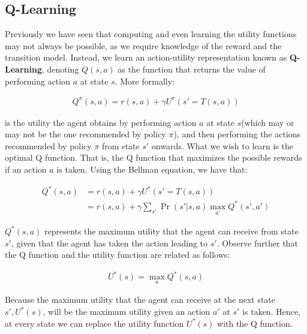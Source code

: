 \documentclass[12pt]{article}
\begin{document}
\subsection{Q-Learning}

Previously we have seen that computing and even learning the utility functions may not always be possible, as we require knowledge of the reward and the transition model. Instead, we learn an action-utility representation known as \textbf{Q-Learning}, denoting $Q(s, a)$ as the function that returns the value of performing action $a$ at state $s$. More formally:

\begin{equation*}
\begin{aligned}
Q^{\pi}(s, a) = r(s, a) + \gamma U^{\pi}(s' = T(s, a)) 
\end{aligned}
\end{equation*}

is the utility the agent obtains by performing action $a$ at state $s$(which may or may not be the one recommended by policy $\pi$), and then performing the actions recommended by policy $\pi$ from state $s'$ onwards. What we wish to learn is the optimal Q function. That is, the Q function that maximizes the possible rewards if an action $a$ is taken. Using the Bellman equation, we have that:

\begin{equation*}
\begin{aligned}
Q^*(s, a) &= r(s, a) + \gamma U^{*}(s' = T(s, a)) \\
&= r(s, a) + \gamma  \sum_{s'} \Pr(s' | s, a) \max_{a'} Q^*(s' ,a')
\end{aligned}
\end{equation*}

$Q^*(s,a)$ represents the maximum utility that the agent can receive from state $s'$, given that the agent has taken the action leading to $s'$. Observe further that the Q function and the utility function are related as follows:

 \begin{equation*}
\begin{aligned}
U^*(s) = \max_{a} Q^*(s ,a)
\end{aligned}
\end{equation*}

Because the maximum utility that the agent can receive at the next state $s', U^*(s)$, will be the maximum utility given an action $a'$ at $s'$ is taken. Hence, at every state we can replace the utility function $U^*(s)$ with the Q function.\\
\end{document}
